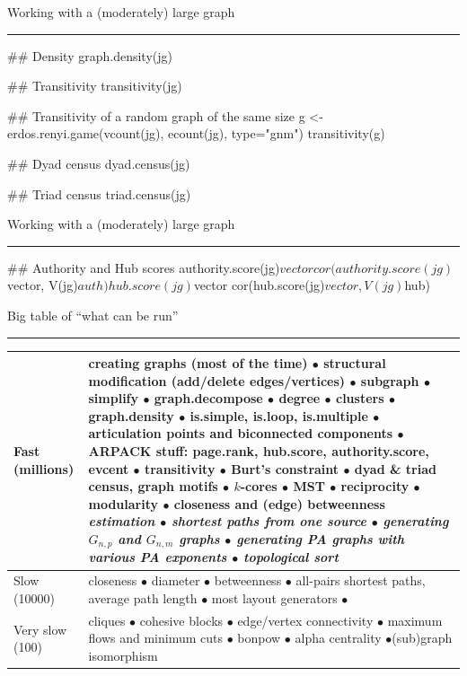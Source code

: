 \documentclass[landscape,fleqno]{foils}
\newcommand{\stitle}[1]{{\color{blue}\Large #1\par\vspace*{10pt}\hrule}}
\newcommand{\bull}{$\bullet$\xspace}
\begin{document}
\newpage
\stitle{Working with a (moderately) large graph}
\begin{Myverb}  
  ## Density
  graph.density(jg)
  
  ## Transitivity
  transitivity(jg)
  
  ## Transitivity of a random graph of the same size
  g <- erdos.renyi.game(vcount(jg), ecount(jg), type="gnm")
  transitivity(g)
  
  ## Dyad census
  dyad.census(jg)
  
  ## Triad census
  triad.census(jg)
  \end{Myverb}  

\newpage
\stitle{Working with a (moderately) large graph}
\begin{Myverb}  
  ## Authority and Hub scores
  authority.score(jg)$vector
  cor(authority.score(jg)$vector, V(jg)$auth)
  
  hub.score(jg)$vector
  cor(hub.score(jg)$vector, V(jg)$hub)
\end{Myverb} 

\newpage
\stitle{Big table of ``what can be run''}

\renewcommand{\arraystretch}{1.7}
\begin{tabularx}{\textwidth}{l|X}
Fast (millions) & creating graphs (most of the time) \bull
       structural modification (add/delete edges/vertices) \bull 
       subgraph \bull simplify \bull graph.decompose \bull 
       degree \bull clusters \bull graph.density \bull is.simple,
       is.loop, is.multiple \bull articulation points and biconnected
       components \bull ARPACK stuff: page.rank, hub.score,
       authority.score, evcent \bull transitivity \bull Burt's
       constraint \bull dyad \& triad census, graph motifs \bull
       $k$-cores \bull MST \bull reciprocity \bull modularity \bull
       closeness and (edge) betweenness \it{estimation} \bull shortest
       paths from one source \bull generating $G_{n,p}$ and $G_{n,m}$
       graphs \bull generating PA graphs with various PA exponents
       \bull topological sort \\
\hline
Slow (10000) & closeness \bull diameter \bull betweenness \bull all-pairs
       shortest paths, average path length \bull most layout
       generators \bull \\
\hline
Very slow (100) & cliques \bull cohesive blocks \bull edge/vertex
            connectivity \bull maximum flows and minimum cuts \bull 
            bonpow \bull alpha centrality \bull (sub)graph isomorphism\\
\end{tabularx}
\end{document}
